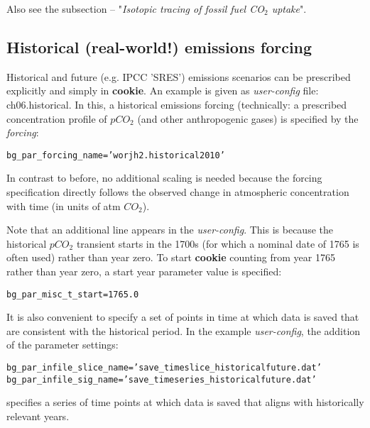 Also see the subsection -- "\textit{Isotopic tracing of fossil fuel CO$_{2}$ uptake}".

\newpage

\subsection{Historical (real-world!) emissions forcing}

Historical and future (e.g. IPCC 'SRES') emissions scenarios can  be prescribed explicitly and simply in \textbf{cookie}. An example is given as \textit{user-config} file: \textsf{\footnotesize ch06.historical}. In this, a historical emissions forcing (technically: a prescribed concentration profile of \(pCO_{2}\) (and other anthropogenic gases) is specified by the \textit{forcing}:
\vspace{-2pt}\small\begin{verbatim}
bg_par_forcing_name=’worjh2.historical2010’
\end{verbatim}\normalsize\vspace{-2pt}
In contrast to before, no additional scaling is needed because the forcing specification directly follows the observed change in atmospheric concentration with time (in units of atm \(CO_{2}\)).

\vspace{1mm}

Note that an additional line appears in the \textit{user-config}. This is because the historical \(pCO_{2}\) transient starts in the 1700s (for which a nominal date of 1765 is often used) rather than year zero. To start \textbf{cookie} counting from year 1765 rather than year zero, a start year parameter value is specified:
\vspace{-2pt}\small\begin{verbatim}
bg_par_misc_t_start=1765.0
\end{verbatim}\normalsize\vspace{-2pt}
It is also convenient to specify a set of points in time at which data is saved that are consistent with the historical period. In the example \textit{user-config}, the addition of the parameter settings:
\vspace{-2pt}\small\begin{verbatim}
bg_par_infile_slice_name=’save_timeslice_historicalfuture.dat’
bg_par_infile_sig_name=’save_timeseries_historicalfuture.dat’
\end{verbatim}\normalsize\vspace{-2pt}
specifies a series of time points at which data is saved that aligns with historically relevant years.


